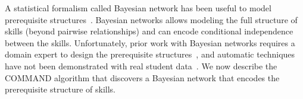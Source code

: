 \documentclass{edm_template}
\newcommand{\hl}[1]{\colorbox{yellow}{#1}}
\begin{document}

A statistical formalism called Bayesian network has been useful to model prerequisite structures~\cite{mislevy1999bayes}. 
Bayesian networks allows  modeling the full structure of skills (beyond pairwise relationships) and can encode conditional independence  between the skills.
Unfortunately, prior work with Bayesian networks requires a domain expert to design the prerequisite structures~\cite{kaser2014beyond},
and automatic techniques have not been demonstrated with real student data~\cite{scheines2014discovering}.
We now describe the COMMAND algorithm that discovers a Bayesian network that encodes the prerequisite structure of skills.

\end{document}

